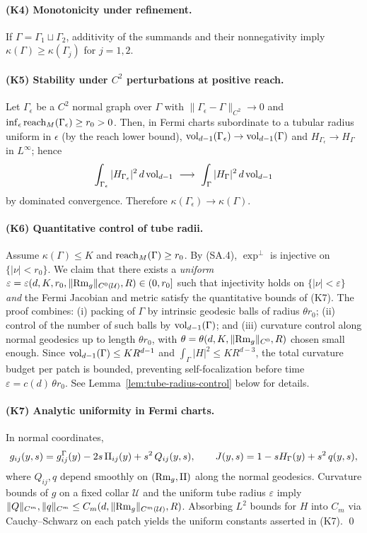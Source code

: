 \paragraph{(K4) Monotonicity under refinement.}
If $\Gamma=\Gamma_1\sqcup\Gamma_2$,
additivity of the summands and their nonnegativity imply
$\kappa(\Gamma)\ge \kappa(\Gamma_j)$ for $j=1,2$.

\paragraph{(K5) Stability under $C^2$ perturbations at positive reach.}
Let $\Gamma_\epsilon$ be a $C^2$ normal graph over $\Gamma$ with $\|\Gamma_\epsilon-\Gamma\|_{C^2}\to 0$
and $\inf_\epsilon \operatorname{reach}_M(\Gamma_\epsilon)\ge r_0>0$.
Then, in Fermi charts subordinate to a tubular radius uniform in $\epsilon$ (by the reach lower bound),
$\operatorname{vol}_{d-1}(\Gamma_\epsilon)\to \operatorname{vol}_{d-1}(\Gamma)$ and
$H_{\Gamma_\epsilon}\to H_\Gamma$ in $L^\infty$; hence
\[
\int_{\Gamma_\epsilon} |H_{\Gamma_\epsilon}|^2\,d\operatorname{vol}_{d-1}\ \longrightarrow\
\int_{\Gamma} |H_{\Gamma}|^2\,d\operatorname{vol}_{d-1}
\]
by dominated convergence. Therefore $\kappa(\Gamma_\epsilon)\to \kappa(\Gamma)$.

\paragraph{(K6) Quantitative control of tube radii.}
Assume $\kappa(\Gamma)\le K$ and $\operatorname{reach}_M(\Gamma)\ge r_0$.
By (SA.4), $\exp^\perp$ is injective on $\{|\nu|<r_0\}$.
We claim that there exists a \emph{uniform} $\varepsilon=\varepsilon(d,K,r_0,\|{\rm Rm}_g\|_{C^0(\mathcal{U})},R)\in(0,r_0]$
such that injectivity holds on $\{|\nu|<\varepsilon\}$ \emph{and}
the Fermi Jacobian and metric satisfy the quantitative bounds of (K7).
The proof combines:
(i) packing of $\Gamma$ by intrinsic geodesic balls of radius $\theta r_0$;
(ii) control of the number of such balls by $\operatorname{vol}_{d-1}(\Gamma)$; and
(iii) curvature control along normal geodesics up to length $\theta r_0$,
with $\theta=\theta(d,K,\|{\rm Rm}_g\|_{C^0},R)$ chosen small enough.
Since $\operatorname{vol}_{d-1}(\Gamma)\le K R^{d-1}$ and $\int_\Gamma |H|^2\le K R^{d-3}$,
the total curvature budget per patch is bounded, preventing self-focalization
before time $\varepsilon=c(d)\,\theta r_0$. See Lemma~\ref{lem:tube-radius-control} below for details.

\paragraph{(K7) Analytic uniformity in Fermi charts.}
In normal coordinates,
\[
g_{ij}(y,s)=g^\Gamma_{ij}(y)-2s\,\mathrm{II}_{ij}(y)+s^2\,Q_{ij}(y,s),
\qquad J(y,s)=1-sH_\Gamma(y)+s^2\,q(y,s),
\]
where $Q_{ij},q$ depend smoothly on $({\rm Rm}_g,\mathrm{II})$ along the normal geodesics.
Curvature bounds of $g$ on a fixed collar $\mathcal{U}$ and the uniform tube radius $\varepsilon$
imply $\|Q\|_{C^m},\|q\|_{C^m}\le C_m(d,\|{\rm Rm}_g\|_{C^m(\mathcal{U})},R)$.
Absorbing $L^2$ bounds for $H$ into $C_m$ via Cauchy–Schwarz on each patch yields the uniform constants asserted in (K7).
\qed

